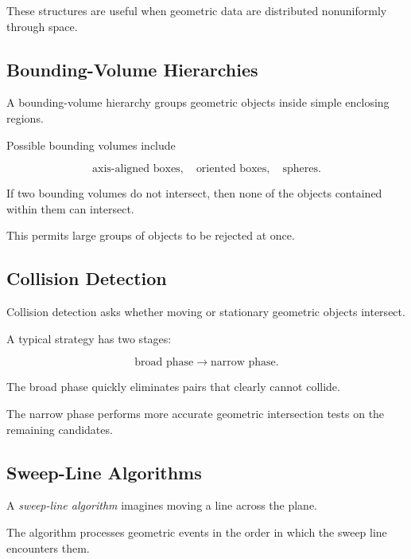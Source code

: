 These structures are useful when geometric data are distributed
nonuniformly through space.

\subsection{Bounding-Volume Hierarchies}
\label{subsec:bounding-volume-hierarchies}

A bounding-volume hierarchy groups geometric objects inside simple enclosing
regions.

Possible bounding volumes include

\[
\boxed{
\text{axis-aligned boxes},
\quad
\text{oriented boxes},
\quad
\text{spheres}.
}
\]

If two bounding volumes do not intersect, then none of the objects contained
within them can intersect.

This permits large groups of objects to be rejected at once.

\subsection{Collision Detection}
\label{subsec:collision-detection}

Collision detection asks whether moving or stationary geometric objects
intersect.

A typical strategy has two stages:

\[
\boxed{
\text{broad phase}
\longrightarrow
\text{narrow phase}.
}
\]

The broad phase quickly eliminates pairs that clearly cannot collide.

The narrow phase performs more accurate geometric intersection tests on the
remaining candidates.

\subsection{Sweep-Line Algorithms}
\label{subsec:sweep-line-algorithms}

A \emph{sweep-line algorithm} imagines moving a line across the plane.

The algorithm processes geometric events in the order in which the sweep
line encounters them.

